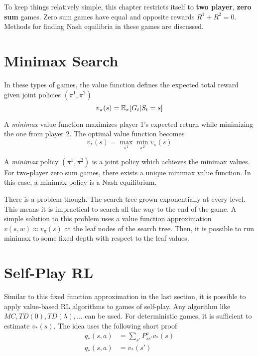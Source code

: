 To keep things relatively simple, this chapter restricts itself to \textbf{two player}, \textbf{zero sum} games. Zero sum games have equal and opposite rewards $R^1 + R^2 = 0$. Methods for finding Nash equilibria in these games are discussed.

\section{Minimax Search}

In these types of games, the value function defines the expected total reward given joint policies $(\pi^1, \pi^2)$
\begin{equation*}
	v_\pi(s) = \operatorname{\mathbb{E}}_\pi[G_t | S_t = s]
\end{equation*}

A \textit{minimax} value function maximizes player 1's expected return while minimizing the one from player 2. The optimal value function becomes
\begin{equation*}
	v_*(s) = \max_{\pi^1} \min_{\pi^2} v_\pi(s)
\end{equation*}

A \textit{minimax} policy $(\pi^1, \pi^2)$ is a joint policy which achieves the minimax values. For two-player zero sum games, there exists a unique minimax value function. In this case, a minimax policy is a Nash equilibrium.

There is a problem though. The search tree grown exponentially at every level. This means it is impractical to search all the way to the end of the game. A simple solution to this problem uses a value function approximation $v(s, w) \approx v_\pi(s)$ at the leaf nodes of the search tree. Then, it is possible to run minimax to some fixed depth with respect to the leaf values.

\section{Self-Play RL}

Similar to this fixed function approximation in the last section, it is possible to apply value-based RL algorithms to games of self-play. Any algorithm like $MC, TD(0), TD(\lambda), ...$ can be used. For deterministic games, it is sufficient to estimate $v_*(s)$. The idea uses the following short proof
\begin{equation*}
	\begin{aligned}
		q_*(s, a) & = \sum_{s'} P^a_{ss'} v_*(s)\\
		q_*(s, a) & = v_*(s')
	\end{aligned}
\end{equation*}

